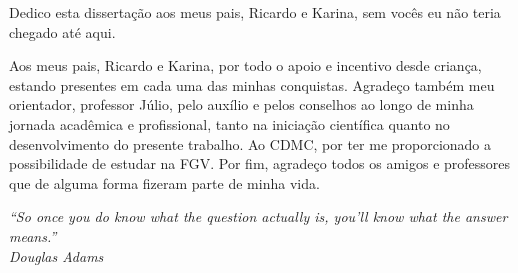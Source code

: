 \begin{dedicatoria}
    \vspace*{\fill}
    \hfill
    \begin{minipage}{.6\textwidth}
     Dedico esta dissertação aos meus pais, Ricardo e Karina, sem vocês eu não teria chegado até aqui. %
    \end{minipage}
\end{dedicatoria}
 
\begin{agradecimentos}
    Aos meus pais, Ricardo e Karina, por todo o apoio e incentivo desde criança, estando presentes em cada uma das minhas conquistas.
    Agradeço também meu orientador, professor Júlio, pelo auxílio e pelos conselhos ao longo de minha jornada acadêmica e profissional, tanto na iniciação científica quanto no desenvolvimento do presente trabalho.
    Ao CDMC, por ter me proporcionado a possibilidade de estudar na FGV.
    Por fim, agradeço todos os amigos e professores que de alguma forma fizeram parte de minha vida.
\end{agradecimentos}

\begin{epigrafe}
\vspace*{\fill}

\begin{flushright}
    \hspace{7.5cm}
    \textit{
        ``So once you do know what the question actually is, you'll know what the answer means.''} \\
        \textit{Douglas Adams} %
\end{flushright}
\end{epigrafe}